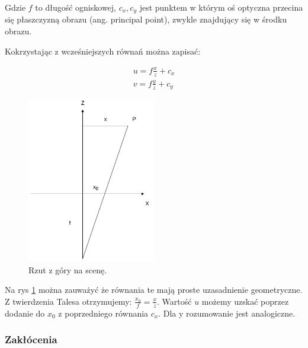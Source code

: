 \documentclass[oneside, eng]{mgr}
\begin{document}
Gdzie $f$ to długość ogniskowej, $c_x, c_y$ jest punktem w którym oś optyczna przecina się płaszczyzną obrazu (ang. principal point), zwykle znajdujący się w środku obrazu.

Kokrzystając z wcześniejszych równań można zapisać:

\begin{align*}
	u = f \frac{x}{z} + c_x \\
	v = f \frac{y}{z} + c_y
\end{align*}

\begin{figure}
\centering
	\includegraphics[width=0.50\textwidth]{rzutowanie.jpg}\par\vspace{1cm}
\caption{Rzut z góry na scenę.}
	\label{fig:projection_up}
\end{figure}

Na rys \ref{fig:projection_up} można zauważyć że równania te mają proste uzasadnienie geometryczne. Z twierdzenia Talesa otrzymujemy: 
$\frac{x_0}{f} = \frac{x}{z}$. Wartość $u$ możemy uzskać poprzez dodanie do $x_0$ z poprzedniego równania $c_x$. Dla y rozumowanie jest analogiczne.


\subsubsection{Zakłócenia}
\end{document}
